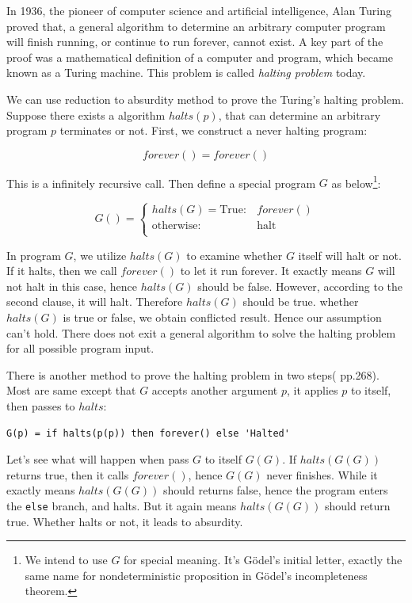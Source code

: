 \documentclass{article}
\begin{document}
In 1936, the pioneer of computer science and artificial intelligence, Alan Turing proved that, a general algorithm to determine an arbitrary computer program will finish running, or continue to run forever, cannot exist. A key part of the proof was a mathematical definition of a computer and program, which became known as a Turing machine. This problem is called {\em halting problem} today.

We can use reduction to absurdity method to prove the Turing's halting problem. Suppose there exists a algorithm $halts(p)$, that can determine an arbitrary program $p$ terminates or not. First, we construct a never halting program:

\[
forever() = forever()
\]

This is a infinitely recursive call. Then define a special program $G$ as below\footnote{We intend to use $G$ for special meaning. It's Gödel's initial letter, exactly the same name for nondeterministic proposition in Gödel's incompleteness theorem.}:

\[
G() = \begin{cases}
halts(G) = \text{True}: & forever() \\
\text{otherwise}: & \text{halt} \\
\end{cases}
\]

In program $G$, we utilize $halts(G)$ to examine whether $G$ itself will halt or not. If it halts, then we call $forever()$ to let it run forever. It exactly means $G$ will not halt in this case, hence $halts(G)$ should be false. However, according to the second clause, it will halt. Therefore $halts(G)$ should be true. whether $halts(G)$ is true or false, we obtain conflicted result. Hence our assumption can't hold. There does not exit a general algorithm to solve the halting problem for all possible program input.

There is another method to prove the halting problem in two steps(\cite{SICP} pp.268). Most are same except that $G$ accepts another argument $p$, it applies $p$ to itself, then passes to $halts$:

\lstset{frame=single}
\begin{lstlisting}
G(p) = if halts(p(p)) then forever() else 'Halted'
\end{lstlisting}

Let's see what will happen when pass $G$ to itself $G(G)$. If $halts(G(G))$ returns true, then it calls $forever()$, hence $G(G)$ never finishes. While it exactly means $halts(G(G))$ should returns false, hence the program enters the \texttt{else} branch, and halts. But it again means $halts(G(G))$ should return true. Whether halts or not, it leads to absurdity.
\end{document}
